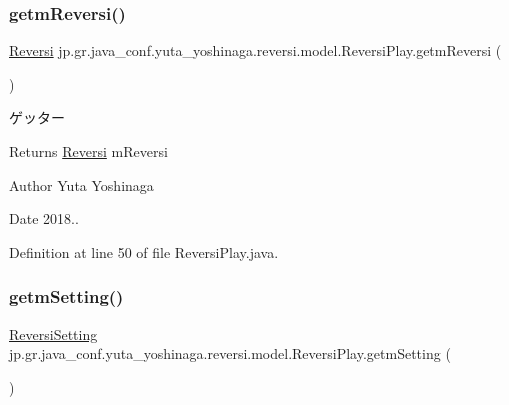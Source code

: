 \subsubsection{\texorpdfstring{getm\+Reversi()}{getmReversi()}}
{\footnotesize\ttfamily \hyperlink{classjp_1_1gr_1_1java__conf_1_1yuta__yoshinaga_1_1reversi_1_1model_1_1_reversi}{Reversi} jp.\+gr.\+java\+\_\+conf.\+yuta\+\_\+yoshinaga.\+reversi.\+model.\+Reversi\+Play.\+getm\+Reversi (\begin{DoxyParamCaption}{ }\end{DoxyParamCaption})}



ゲッター 

\begin{DoxyReturn}{Returns}
\hyperlink{classjp_1_1gr_1_1java__conf_1_1yuta__yoshinaga_1_1reversi_1_1model_1_1_reversi}{Reversi} m\+Reversi 
\end{DoxyReturn}
\begin{DoxyAuthor}{Author}
Yuta Yoshinaga 
\end{DoxyAuthor}
\begin{DoxyDate}{Date}
2018.. 
\end{DoxyDate}


Definition at line 50 of file Reversi\+Play.\+java.

\mbox{\label{classjp_1_1gr_1_1java__conf_1_1yuta__yoshinaga_1_1reversi_1_1model_1_1_reversi_play_a7190dc24d3704caf7a3c0e3c31ca69de}} 
\subsubsection{\texorpdfstring{getm\+Setting()}{getmSetting()}}
{\footnotesize\ttfamily \hyperlink{classjp_1_1gr_1_1java__conf_1_1yuta__yoshinaga_1_1reversi_1_1model_1_1_reversi_setting}{Reversi\+Setting} jp.\+gr.\+java\+\_\+conf.\+yuta\+\_\+yoshinaga.\+reversi.\+model.\+Reversi\+Play.\+getm\+Setting (\begin{DoxyParamCaption}{ }\end{DoxyParamCaption})}



